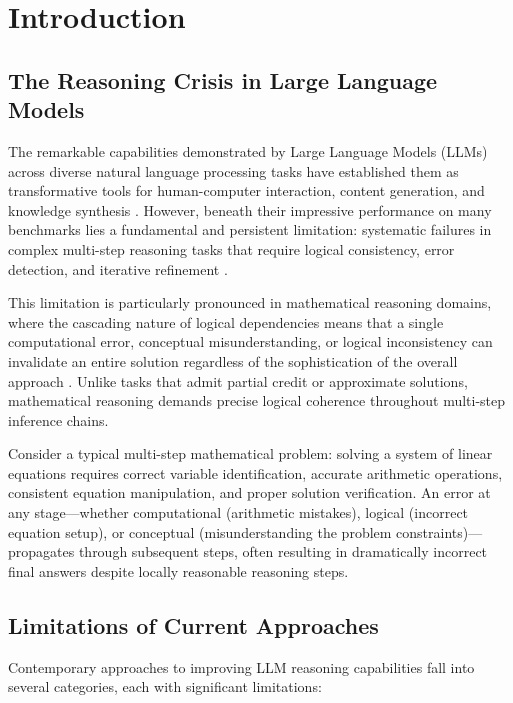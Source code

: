 \documentclass[10pt,twocolumn]{article}
\begin{document}
\section{Introduction}

\subsection{The Reasoning Crisis in Large Language Models}

The remarkable capabilities demonstrated by Large Language Models (LLMs) across diverse natural language processing tasks have established them as transformative tools for human-computer interaction, content generation, and knowledge synthesis \cite{brown2020language, ouyang2022training, openai2023gpt4}. However, beneath their impressive performance on many benchmarks lies a fundamental and persistent limitation: systematic failures in complex multi-step reasoning tasks that require logical consistency, error detection, and iterative refinement \cite{wei2022emergent, rae2021scaling}.

This limitation is particularly pronounced in mathematical reasoning domains, where the cascading nature of logical dependencies means that a single computational error, conceptual misunderstanding, or logical inconsistency can invalidate an entire solution regardless of the sophistication of the overall approach \cite{hendrycks2021measuring, cobbe2021training}. Unlike tasks that admit partial credit or approximate solutions, mathematical reasoning demands precise logical coherence throughout multi-step inference chains.

Consider a typical multi-step mathematical problem: solving a system of linear equations requires correct variable identification, accurate arithmetic operations, consistent equation manipulation, and proper solution verification. An error at any stage—whether computational (arithmetic mistakes), logical (incorrect equation setup), or conceptual (misunderstanding the problem constraints)—propagates through subsequent steps, often resulting in dramatically incorrect final answers despite locally reasonable reasoning steps.

\subsection{Limitations of Current Approaches}

Contemporary approaches to improving LLM reasoning capabilities fall into several categories, each with significant limitations:
\end{document}
